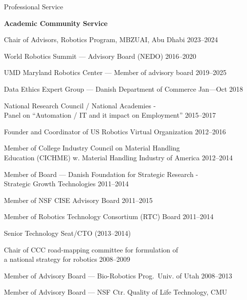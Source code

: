 \documentclass{article}
\newenvironment{sublist}{%
  \begin{list}{}{%
      \setlength{\itemsep}{0em}\setlength{\parsep}{0em}%
      \setlength{\topsep}{0em}\setlength{\parskip}{0em}%
    }%
}%
{ \end{list} }
\begin{document}
\begin{cv}
	\begin{cvlist}{Professional Service}%
		\item {\bf Academic Community Service}
		\begin{itemize}
			\item Chair of Advisors, Robotics Program, MBZUAI, Abu Dhabi
			      \cftdotfill{\cftdotsep} 2023--2024
			\item World Robotics Summit --- Advisory Board (NEDO) \cftdotfill{\cftdotsep}
			      2016--2020
			\item UMD Maryland Robotics Center --- Member of advisory board
			      \cftdotfill{\cftdotsep} 2019--2025
			\item Data Ethics Expert Group --- Danish Department of Commerce
			      \cftdotfill{\cftdotsep} Jan---Oct 2018
			\item National Research Council / National Academies -\\ Panel on ``Automation /
			      IT and it impact on Employment'' \cftdotfill{\cftdotsep} 2015--2017
			\item Founder and Coordinator of US Robotics Virtual Organization
			      \cftdotfill{\cftdotsep} 2012--2016
			\item Member of College Industry Council on Material Handling\\
			      Education (CICHME) w. Material Handling Industry of America
			      \cftdotfill{\cftdotsep} 2012--2014
			\item Member of Board --- Danish Foundation for Strategic Research -\\
			      Strategic Growth Technologies \cftdotfill{\cftdotsep} 2011--2014
			\item Member of NSF CISE Advisory Board \cftdotfill{\cftdotsep} 2011--2015
			\item Member of Robotics Technology Consortium (RTC) Board
			      \cftdotfill{\cftdotsep} 2011--2014
			      \begin{sublist}
				      \item Senior Technology Seat/CTO (2013--2014)
			      \end{sublist}
			\item Chair of CCC road-mapping committee for formulation of \\
			      a national strategy for robotics \cftdotfill{\cftdotsep} 2008--2009
			\item Member of Advisory Board --- Bio-Robotics Prog.\ Univ. of Utah
			      \cftdotfill{\cftdotsep} 2008--2013
			\item Member of Advisory Board --- NSF Ctr. Quality of Life Technology, CMU

\end{itemize}
\end{cvlist}
\end{cv}
\end{document}
